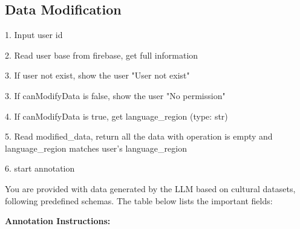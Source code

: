 \subsection{Data Modification}

1. Input user id

2. Read user base from firebase, get full information

3. If user not exist, show the user "User not exist"

3. If canModifyData is false, show the user "No permission"

4. If canModifyData is true, get language_region (type: str)

5. Read modified_data, return all the data with operation is empty and language_region matches user's language_region

6. start annotation

You are provided with data generated by the LLM based on cultural datasets, following predefined schemas. The table below lists the important fields:

\begin{table}[h]
\centering
{}
\caption{Schema fields in the provided dataset. These enforce consistency and structure across all data items.}
\label{tab:metadata_fields}
\end{table}

\textbf{Annotation Instructions:}

